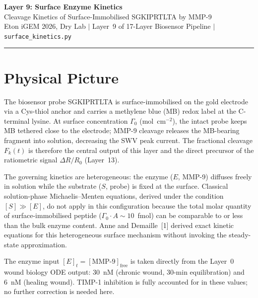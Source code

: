 \documentclass[10pt,a4paper]{article}
\numberwithin{equation}{section}
\newcommand{\cit}[1]{[#1]}
\newcommand{\Gz}{\Gamma_0}
\begin{document}
\begin{center}
{\LARGE\bfseries Layer 9: Surface Enzyme Kinetics}\\[0.4em]
{\large Cleavage Kinetics of Surface-Immobilised SGKIPRTLTA by MMP-9}\\[0.25em]
{\small\color{gray} Eton iGEM 2026, Dry Lab \quad$|$\quad
Layer~9 of 17-Layer Biosensor Pipeline \quad$|$\quad
\texttt{surface\_kinetics.py}}
\end{center}
\vspace{0.4em}\hrule\vspace{0.7em}

\section{Physical Picture}
\label{sec:physical}

The biosensor probe SGKIPRTLTA is surface-immobilised on the gold electrode via a
Cys-thiol anchor and carries a methylene blue (MB) redox label at the C-terminal
lysine. At surface concentration $\Gz$ (mol~cm$^{-2}$), the intact probe keeps MB
tethered close to the electrode; MMP-9 cleavage releases the MB-bearing fragment
into solution, decreasing the SWV peak current. The fractional cleavage $F_k(t)$
is therefore the central output of this layer and the direct precursor of the
ratiometric signal $\Delta R/R_0$ (Layer~13).

The governing kinetics are heterogeneous: the enzyme ($E$, MMP-9) diffuses freely
in solution while the substrate ($S$, probe) is fixed at the surface. Classical
solution-phase Michaelis--Menten equations, derived under the condition
$[S] \gg [E]$, do not apply in this configuration because the total molar quantity
of surface-immobilised peptide ($\Gz \cdot A \sim 10$~fmol) can be comparable to
or less than the bulk enzyme content. Anne and Demaille~\cit{1} derived exact
kinetic equations for this heterogeneous surface mechanism without invoking the
steady-state approximation.

The enzyme input $[E]_t = [\text{MMP-9}]_{\text{free}}$ is taken directly from the
Layer~0 wound biology ODE output: 30~nM (chronic wound, 30-min equilibration) and
6~nM (healing wound). TIMP-1 inhibition is fully accounted for in these values;
no further correction is needed here.

\end{document}
